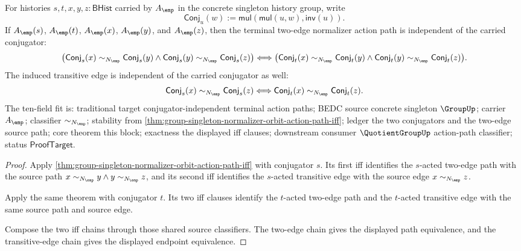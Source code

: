 \begin{theorem}
\label{thm:group-singleton-normalizer-orbit-action-conjugator-independence}
For histories $s,t,x,y,z:\mathsf{BHist}$ carried by $A_{\emp}$ in the concrete
singleton history group, write
$$
\mathsf{Conj}_u(w):=\mathsf{mul}(\mathsf{mul}(u,w),\mathsf{inv}(u)).
$$
If $A_{\emp}(s)$, $A_{\emp}(t)$, $A_{\emp}(x)$, $A_{\emp}(y)$, and
$A_{\emp}(z)$, then the terminal two-edge normalizer action path is independent
of the carried conjugator:
$$
\bigl(
\mathsf{Conj}_s(x)\sim_{N_{\emp}}\mathsf{Conj}_s(y)
\land
\mathsf{Conj}_s(y)\sim_{N_{\emp}}\mathsf{Conj}_s(z)
\bigr)
\Longleftrightarrow
\bigl(
\mathsf{Conj}_t(x)\sim_{N_{\emp}}\mathsf{Conj}_t(y)
\land
\mathsf{Conj}_t(y)\sim_{N_{\emp}}\mathsf{Conj}_t(z)
\bigr).
$$
The induced transitive edge is independent of the carried conjugator as well:
$$
\mathsf{Conj}_s(x)\sim_{N_{\emp}}\mathsf{Conj}_s(z)
\Longleftrightarrow
\mathsf{Conj}_t(x)\sim_{N_{\emp}}\mathsf{Conj}_t(z).
$$
The ten-field fit is: traditional target conjugator-independent terminal action
paths; BEDC source concrete singleton $\GroupUp$; carrier $A_{\emp}$;
classifier $\sim_{N_{\emp}}$; stability from
\autoref{thm:group-singleton-normalizer-orbit-action-path-iff}; ledger the two
conjugators and the two-edge source path; core theorem this block; exactness
the displayed iff clauses; downstream consumer $\QuotientGroupUp$ action-path
classifier; status $\mathsf{ProofTarget}$.
\end{theorem}
\begin{proof}
Apply \autoref{thm:group-singleton-normalizer-orbit-action-path-iff} with
conjugator $s$. Its first iff identifies the $s$-acted two-edge path with the
source path $x\sim_{N_{\emp}}y\land y\sim_{N_{\emp}}z$, and its second iff
identifies the $s$-acted transitive edge with the source edge
$x\sim_{N_{\emp}}z$.

Apply the same theorem with conjugator $t$. Its two iff clauses identify the
$t$-acted two-edge path and the $t$-acted transitive edge with the same source
path and source edge.

Compose the two iff chains through those shared source classifiers. The
two-edge chain gives the displayed path equivalence, and the transitive-edge
chain gives the displayed endpoint equivalence.
\end{proof}

